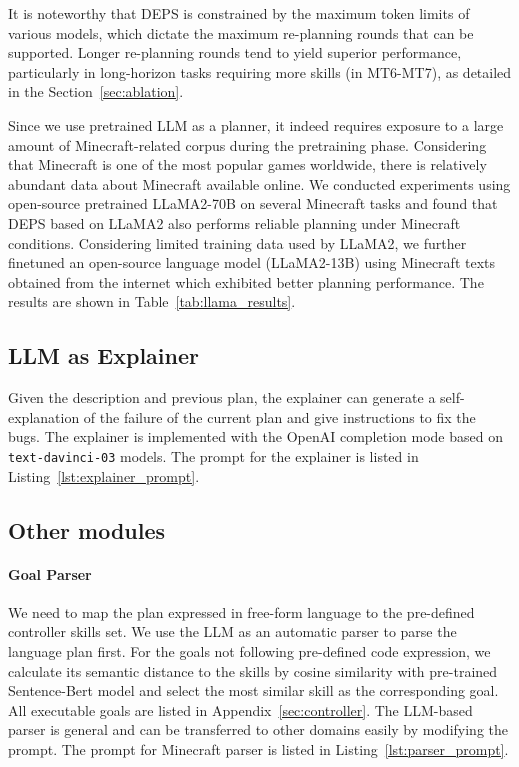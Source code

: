 \documentclass{article}
\begin{document}
It is noteworthy that DEPS is constrained by the maximum token limits of various models, which dictate the maximum re-planning rounds that can be supported. Longer re-planning rounds tend to yield superior performance, particularly in long-horizon tasks requiring more skills (in MT6-MT7), as detailed in the Section~\ref{sec:ablation}.

Since we use pretrained LLM as a planner, it indeed requires exposure to a large amount of Minecraft-related corpus during the pretraining phase. Considering that Minecraft is one of the most popular games worldwide, there is relatively abundant data about Minecraft available online. We conducted experiments using open-source pretrained LLaMA2-70B on several Minecraft tasks and found that DEPS based on LLaMA2 also performs reliable planning under Minecraft conditions. Considering limited training data used by LLaMA2, we further finetuned an open-source language model (LLaMA2-13B) using Minecraft texts obtained from the internet which exhibited better planning performance. The results are shown in Table~\ref{tab:llama_results}. 



\subsection{LLM as Explainer}

Given the description and previous plan, the explainer can generate a self-explanation of the failure of the current plan and give instructions to fix the bugs. The explainer is implemented with the OpenAI completion mode based on \texttt{text-davinci-03} models. The prompt for the explainer is listed in Listing~\ref{lst:explainer_prompt}.



\subsection{Other modules}

\paragraph{Goal Parser}
We need to map the plan expressed in free-form language to the pre-defined controller skills set. We use the LLM as an automatic parser to parse the language plan first. For the goals not following pre-defined code expression, we calculate its semantic distance to the skills by cosine similarity with pre-trained Sentence-Bert model \cite{sentencebert} and select the most similar skill as the corresponding goal. All executable goals are listed in Appendix~\ref{sec:controller}. The LLM-based parser is general and can be transferred to other domains easily by modifying the prompt. The prompt for Minecraft parser is listed in Listing~\ref{lst:parser_prompt}.
\end{document}
